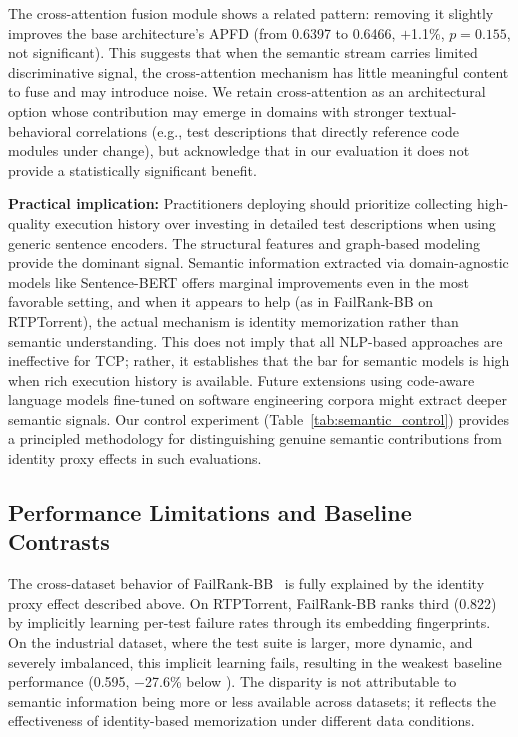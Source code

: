The cross-attention fusion module shows a related pattern: removing it
slightly improves the base architecture's APFD (from 0.6397 to 0.6466,
$+$1.1\%, $p = 0.155$, not significant). This suggests that when the
semantic stream carries limited discriminative signal, the cross-attention
mechanism has little meaningful content to fuse and may introduce noise.
We retain cross-attention as an architectural option whose contribution
may emerge in domains with stronger textual-behavioral correlations
(e.g., test descriptions that directly reference code modules under
change), but acknowledge that in our evaluation it does not provide a
statistically significant benefit.

\textbf{Practical implication:} Practitioners deploying \filopriori{}
should prioritize collecting high-quality execution history over investing
in detailed test descriptions when using generic sentence encoders.
The structural features and graph-based modeling provide the dominant
signal. Semantic information extracted via domain-agnostic models like
Sentence-BERT offers marginal improvements even in the most favorable
setting, and when it appears to help (as in FailRank-BB on RTPTorrent),
the actual mechanism is identity memorization rather than semantic
understanding. This does not imply that all NLP-based approaches are
ineffective for TCP; rather, it establishes that the bar for semantic
models is high when rich execution history is available. Future
extensions using code-aware language models fine-tuned on software
engineering corpora might extract deeper semantic signals. Our control
experiment (Table~\ref{tab:semantic_control}) provides a principled
methodology for distinguishing genuine semantic contributions from
identity proxy effects in such evaluations.

\subsection{Performance Limitations and Baseline Contrasts}

The cross-dataset behavior of FailRank-BB~\cite{hernandes2025method}
is fully explained by the identity proxy effect described above.
On RTPTorrent, FailRank-BB ranks third (0.822) by implicitly learning
per-test failure rates through its embedding fingerprints. On the
industrial dataset, where the test suite is larger, more dynamic, and
severely imbalanced, this implicit learning fails, resulting in the
weakest baseline performance (0.595, $-$27.6\% below \filopriori{}).
The disparity is not attributable to semantic information being more
or less available across datasets; it reflects the effectiveness of
identity-based memorization under different data conditions.

